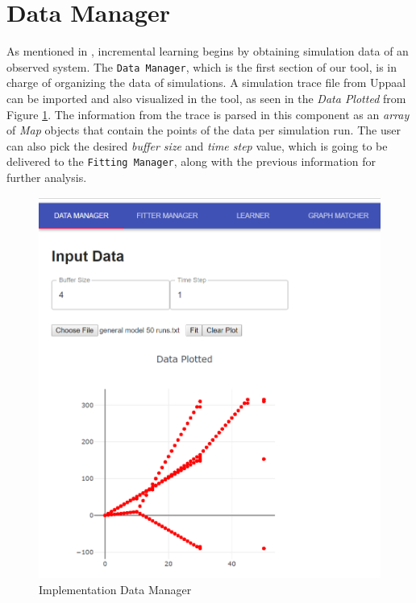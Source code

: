 \section{Data Manager}
As mentioned in , incremental learning begins by obtaining simulation data of an observed system. 
%
The \texttt{Data Manager}, which is the first section of our tool,  is in charge of organizing the data of simulations.
%
A simulation trace file from Uppaal can be imported and also visualized in the tool, as seen in the \textit{Data Plotted} from Figure \ref{data_manager}.
%
The information from the trace is parsed in this component as an \textit{array} of \textit{Map} objects that contain the points of the data per simulation run. 
%
The user can also pick the desired \textit{buffer size} and \textit{time step} value, which is going to be delivered to the \texttt{Fitting Manager}, along with the previous information for further analysis.
%
\begin{figure}[h]
	\centering
	\includegraphics[scale=0.35]{./pictures/implementation/data_manager.png}
	\caption{Implementation Data Manager}
	\label{data_manager}
\end{figure}

